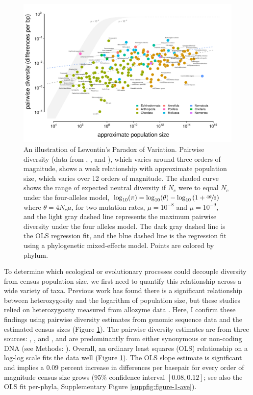 \documentclass[11pt]{article}
\newcommand{\Newnameref}[1]{\textit{\nameref{#1}}}
\newcommand{\logt}{\log_{10}}
\begin{document}
\begin{figure}[t!]
  \centering
  \includegraphics[width=\textwidth]{figures/diversity_popsize_full.pdf}

  \caption{An illustration of Lewontin's Paradox of Variation. Pairwise
    diversity (data from \cite{Leffler2012-zj}, \cite{Corbett-Detig2015-gt},
    and \cite{Romiguier2014-bp}), which varies around three orders of
    magnitude, shows a weak relationship with approximate population size,
    which varies over 12 orders of magnitude.  The shaded curve shows the range
    of expected neutral diversity if $N_e$ were to equal $N_c$ under the
    four-alleles model, $\log_{10}(\pi) = \logt(\theta) - \logt{(1 +
    \nicefrac{4\theta}{3})}$ where $\theta = 4N_c \mu$, for two mutation rates,
    $\mu = 10^{-8}$ and $\mu = 10^{-9}$, and the light gray dashed line
    represents the maximum pairwise diversity under the four alleles model. The
    dark gray dashed line is the OLS regression fit, and the blue
    dashed line is the regression fit using a phylogenetic mixed-effects model.
    Points are colored by phylum.}

  \label{fig:figure-1}
\end{figure}

To determine which ecological or evolutionary processes could decouple
diversity from census population size, we first need to quantify this
relationship across a wide variety of taxa. Previous work has found there is a
significant relationship between heterozygosity and the logarithm of population
size, but these studies relied on heterozygosity measured from allozyme data
\parencite{Soule1976-he,Frankham1996-yb,Nei1984-zi}. Here, I confirm these
findings using pairwise diversity estimates from genomic sequence data and the
estimated census sizes (Figure \ref{fig:figure-1}). The pairwise diversity
estimates are from three sources: \textcite{Leffler2012-zj},
\textcite{Corbett-Detig2015-gt}, and \textcite{Romiguier2014-bp}, and are
predominantly from either synonymous or non-coding DNA (see Methods:
\Newnameref{sec:methods-diversity}). Overall, an ordinary least squares (OLS)
relationship on a log-log scale fits the data well (Figure \ref{fig:figure-1}).
The OLS slope estimate is significant and implies a 0.09 percent increase in
differences per basepair for every order of magnitude census size grows (95\%
confidence interval $[0.08, 0.12]$; see also the OLS fit per-phyla,
Supplementary Figure \ref{suppfig:figure-1-ave}). 
\end{document}

